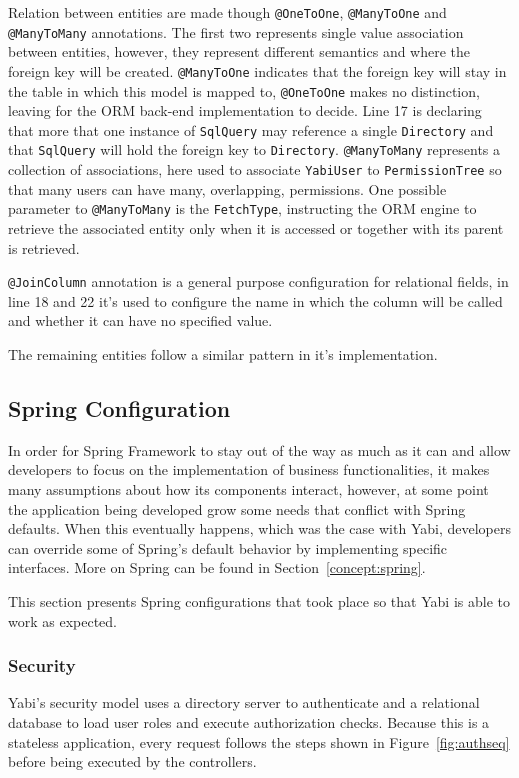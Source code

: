 Relation between entities are made though \texttt{@OneToOne}, \texttt{@ManyToOne} and \texttt{@ManyToMany} annotations.
The first two represents single value association between entities, however, they represent different semantics and where the foreign key will be created.
\texttt{@ManyToOne} indicates that the foreign key will stay in the table in which this model is mapped to, \texttt{@OneToOne} makes no distinction, leaving for the \gls{ORM} back-end implementation to decide.
Line 17 is declaring that more that one instance of \texttt{SqlQuery} may reference a single \texttt{Directory} and that \texttt{SqlQuery} will hold the foreign key to \texttt{Directory}.
\texttt{@ManyToMany} represents a collection of associations, here used to associate \texttt{YabiUser} to \texttt{PermissionTree} so that many users can have many, overlapping, permissions. One possible parameter to \texttt{@ManyToMany} is the \texttt{FetchType}, instructing the \gls{ORM} engine to retrieve the associated entity only when it is accessed or together with its parent is retrieved.

\texttt{@JoinColumn} annotation is a general purpose configuration for relational fields, in line 18 and 22 it's used to configure the name in which the column will be called and whether it can have no specified value.



The remaining entities follow a similar pattern in it's implementation.

\subsection{Spring Configuration}
In order for Spring Framework to stay out of the way as much as it can and allow developers to focus on the implementation of business functionalities, it makes many assumptions about how its components interact, however, at some point the application being developed grow some needs that conflict with Spring defaults. When this eventually happens, which was the case with \gls{Yabi}, developers can override some of Spring's default behavior by implementing specific interfaces. More on Spring can be found in Section~\ref{concept:spring}.

This section presents Spring configurations that took place so that \gls{Yabi} is able to work as expected.

\subsubsection{Security}
\gls{Yabi}'s security model uses a directory server to authenticate and a relational database to load user roles and execute authorization checks. Because this is a stateless application, every request follows the steps shown in Figure~\ref{fig:authseq} before being executed by the controllers.

